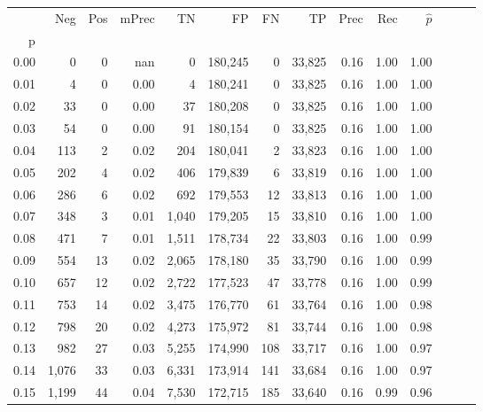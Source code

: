 \begin{tabular}{rrrrrrrrrrrrrr}
\toprule
{} &    Neg &  Pos & mPrec &       TN &       FP &      FN &      TP &  Prec &   Rec & $\hat{p}$ \\
p    &        &      &       &          &          &         &         &       &       &           \\
\midrule
0.00 &      0 &    0 &   nan &        0 &  180,245 &       0 &  33,825 &  0.16 &  1.00 &      1.00 \\
0.01 &      4 &    0 &  0.00 &        4 &  180,241 &       0 &  33,825 &  0.16 &  1.00 &      1.00 \\
0.02 &     33 &    0 &  0.00 &       37 &  180,208 &       0 &  33,825 &  0.16 &  1.00 &      1.00 \\
0.03 &     54 &    0 &  0.00 &       91 &  180,154 &       0 &  33,825 &  0.16 &  1.00 &      1.00 \\
0.04 &    113 &    2 &  0.02 &      204 &  180,041 &       2 &  33,823 &  0.16 &  1.00 &      1.00 \\
0.05 &    202 &    4 &  0.02 &      406 &  179,839 &       6 &  33,819 &  0.16 &  1.00 &      1.00 \\
0.06 &    286 &    6 &  0.02 &      692 &  179,553 &      12 &  33,813 &  0.16 &  1.00 &      1.00 \\
0.07 &    348 &    3 &  0.01 &    1,040 &  179,205 &      15 &  33,810 &  0.16 &  1.00 &      1.00 \\
0.08 &    471 &    7 &  0.01 &    1,511 &  178,734 &      22 &  33,803 &  0.16 &  1.00 &      0.99 \\
0.09 &    554 &   13 &  0.02 &    2,065 &  178,180 &      35 &  33,790 &  0.16 &  1.00 &      0.99 \\
0.10 &    657 &   12 &  0.02 &    2,722 &  177,523 &      47 &  33,778 &  0.16 &  1.00 &      0.99 \\
0.11 &    753 &   14 &  0.02 &    3,475 &  176,770 &      61 &  33,764 &  0.16 &  1.00 &      0.98 \\
0.12 &    798 &   20 &  0.02 &    4,273 &  175,972 &      81 &  33,744 &  0.16 &  1.00 &      0.98 \\
0.13 &    982 &   27 &  0.03 &    5,255 &  174,990 &     108 &  33,717 &  0.16 &  1.00 &      0.97 \\
0.14 &  1,076 &   33 &  0.03 &    6,331 &  173,914 &     141 &  33,684 &  0.16 &  1.00 &      0.97 \\
0.15 &  1,199 &   44 &  0.04 &    7,530 &  172,715 &     185 &  33,640 &  0.16 &  0.99 &      0.96 \\

\end{tabular}
